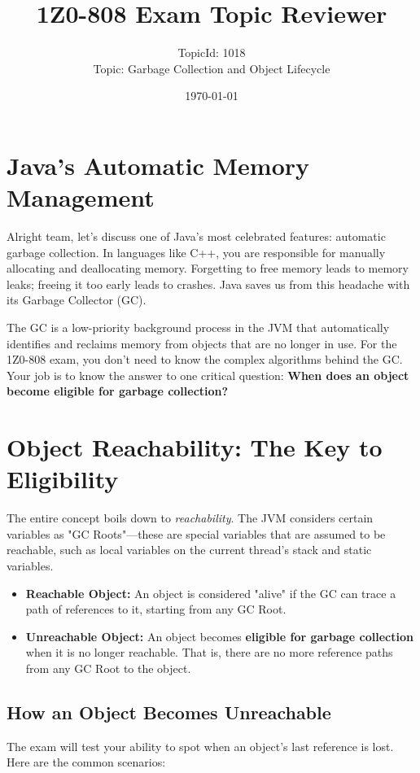 \documentclass[12pt]{article}
\title{\textbf{1Z0-808 Exam Topic Reviewer}}
\author{TopicId: 1018 \\ Topic: Garbage Collection and Object Lifecycle}
\date{\today}
\begin{document}
\maketitle
\newpage\begin{enumerate}[label=(\arabic*)]
\section*{Java's Automatic Memory Management}
Alright team, let's discuss one of Java's most celebrated features: automatic garbage collection. In languages like C++, you are responsible for manually allocating and deallocating memory. Forgetting to free memory leads to memory leaks; freeing it too early leads to crashes. Java saves us from this headache with its Garbage Collector (GC).

The GC is a low-priority background process in the JVM that automatically identifies and reclaims memory from objects that are no longer in use. For the 1Z0-808 exam, you don't need to know the complex algorithms behind the GC. Your job is to know the answer to one critical question: \textbf{When does an object become eligible for garbage collection?}

\section{Object Reachability: The Key to Eligibility}
The entire concept boils down to \textit{reachability}. The JVM considers certain variables as "GC Roots"—these are special variables that are assumed to be reachable, such as local variables on the current thread's stack and static variables.
\begin{itemize}
    \item \textbf{Reachable Object:} An object is considered "alive" if the GC can trace a path of references to it, starting from any GC Root.
    \item \textbf{Unreachable Object:} An object becomes \textbf{eligible for garbage collection} when it is no longer reachable. That is, there are no more reference paths from any GC Root to the object.
\end{itemize}

\subsection*{How an Object Becomes Unreachable}
The exam will test your ability to spot when an object's last reference is lost. Here are the common scenarios:


\end{enumerate}
\end{document}
